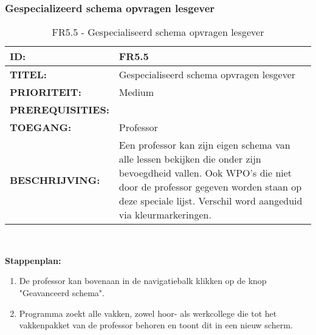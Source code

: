  
\subsubsection{Gespecializeerd schema opvragen lesgever}       
\noindent\begin{table}[H]
            \begin{tabular}{l | p{10cm}}
                \textbf{ID:} & FR5.5 \\ \hline
                \textbf{TITEL:} & Gespecialiseerd schema opvragen lesgever\\ \hline
                \textbf{PRIORITEIT:} &  Medium \\ \hline
                \textbf{PREREQUISITIES:} & \\ \hline
                \textbf{TOEGANG:} & Professor \\ \hline
                \textbf{BESCHRIJVING:} & Een professor kan zijn eigen schema van alle lessen bekijken die onder zijn bevoegdheid vallen. Ook WPO's die niet door de professor gegeven worden staan op deze speciale lijst. Verschil word aangeduid via kleurmarkeringen. \\ 
            \end{tabular}\\
            \caption{FR5.5 - Gespecialiseerd schema opvragen lesgever}
            \label{tab:FR5.5 - Gespecializeerd schema opvragen lesgever}
        \end{table}
        
\textbf{Stappenplan:}
\begin{enumerate}
\item De professor kan bovenaan in de navigatiebalk klikken op de knop "Geavanceerd schema".
\item Programma zoekt alle vakken, zowel hoor- als werkcollege die tot het vakkenpakket van de professor behoren en toont dit in een nieuw scherm.
\end{enumerate}